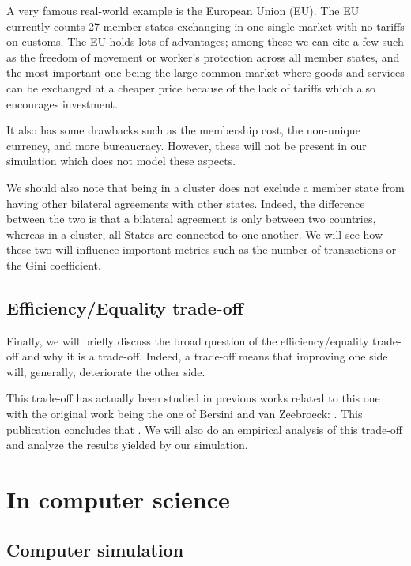     A very famous real-world example is the European Union (EU). The EU currently counts 27 member states exchanging in one single market with no tariffs on customs. The EU holds lots of advantages; among these we can cite a few such as the freedom of movement or worker's protection across all member states, and the most important one being the large common market where goods and services can be exchanged at a cheaper price because of the lack of tariffs which also encourages investment.
    
    It also has some drawbacks such as the membership cost, the non-unique currency, and more bureaucracy. However, these will not be present in our simulation which does not model these aspects.
    
    We should also note that being in a cluster does not exclude a member state from having other bilateral agreements with other states. Indeed, the difference between the two is that a bilateral agreement is only between two countries, whereas in a cluster, all States are connected to one another. We will see how these two will influence important metrics such as the number of transactions or the Gini coefficient.

\subsection{Efficiency/Equality trade-off}
    Finally, we will briefly discuss the broad question of the efficiency/equality trade-off and why it is a trade-off. Indeed, a trade-off means that improving one side will, generally, deteriorate the other side.
    
    This trade-off has actually been studied in previous works related to this one with the original work being the one of Bersini and van Zeebroeck: . This publication concludes that  \cite{bersini}. We will also do an empirical analysis of this trade-off and analyze the results yielded by our simulation.
    

\section{In computer science}

    \subsection{Computer simulation}

